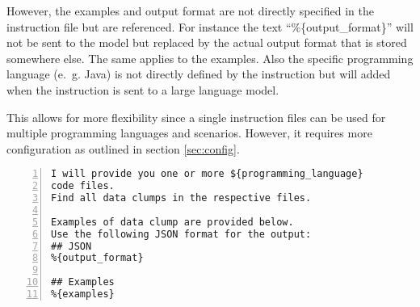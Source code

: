 However, the examples and output format are not directly specified in the instruction file but are referenced. For instance the text \enquote{\%\{output\_format\}} will not be sent to the model but replaced by the actual output format that is stored somewhere else. The same applies to the examples. Also the specific programming language (e.~g. Java) is not directly defined by the instruction but will added when the instruction is sent to a large language model.

This allows for more flexibility since a single instruction files can be used for multiple programming languages and scenarios. However, it requires more configuration as outlined in section \ref{sec:config}.
\begin{lstlisting}[caption={Instruction file example}, label={lst:nstruction_template}, captionpos=b, numbers=left, ]
I will provide you one or more ${programming_language}
code files.
Find all data clumps in the respective files.

Examples of data clump are provided below.
Use the following JSON format for the output:
## JSON
%{output_format}

## Examples
%{examples}
\end{lstlisting}


\hfill
